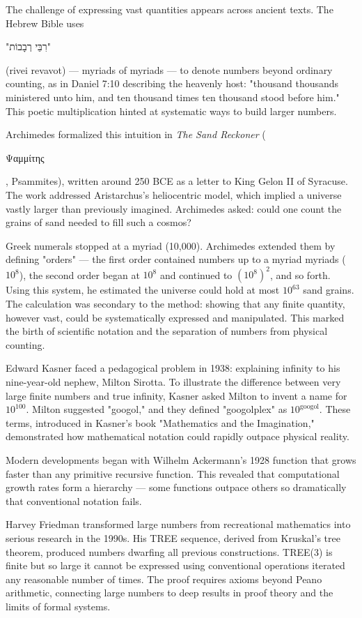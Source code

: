 
\begin{historical}
    The challenge of expressing vast quantities appears across ancient texts. The Hebrew Bible uses \begin{hebrew}"רִבֵּי רְבָבוֹת"\end{hebrew} (rivei revavot) — myriads of myriads — to denote numbers beyond ordinary counting, as in Daniel 7:10 describing the heavenly host: "thousand thousands ministered unto him, and ten thousand times ten thousand stood before him." This poetic multiplication hinted at systematic ways to build larger numbers.

Archimedes formalized this intuition in \textit{The Sand Reckoner} (\begin{greek}Ψαμμίτης\end{greek}, Psammites), written around 250 BCE as a letter to King Gelon II of Syracuse. The work addressed Aristarchus's heliocentric model, which implied a universe vastly larger than previously imagined. Archimedes asked: could one count the grains of sand needed to fill such a cosmos? 

Greek numerals stopped at a myriad (10,000). Archimedes extended them by defining "orders" — the first order contained numbers up to a myriad myriads ($10^8$), the second order began at $10^8$ and continued to $(10^8)^2$, and so forth. Using this system, he estimated the universe could hold at most $10^{63}$ sand grains. The calculation was secondary to the method: showing that any finite quantity, however vast, could be systematically expressed and manipulated. This marked the birth of scientific notation and the separation of numbers from physical counting.

Edward Kasner faced a pedagogical problem in 1938: explaining infinity to his nine-year-old nephew, Milton Sirotta. To illustrate the difference between very large finite numbers and true infinity, Kasner asked Milton to invent a name for $10^{100}$. Milton suggested "googol," and they defined "googolplex" as $10^{\text{googol}}$. These terms, introduced in Kasner's book "Mathematics and the Imagination," demonstrated how mathematical notation could rapidly outpace physical reality.

Modern developments began with Wilhelm Ackermann's 1928 function that grows faster than any primitive recursive function. This revealed that computational growth rates form a hierarchy — some functions outpace others so dramatically that conventional notation fails.

Harvey Friedman transformed large numbers from recreational mathematics into serious research in the 1990s. His TREE sequence, derived from Kruskal's tree theorem, produced numbers dwarfing all previous constructions. TREE(3) is finite but so large it cannot be expressed using conventional operations iterated any reasonable number of times. The proof requires axioms beyond Peano arithmetic, connecting large numbers to deep results in proof theory and the limits of formal systems.
\end{historical}